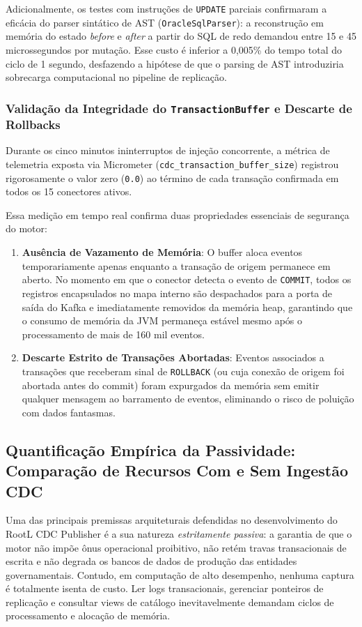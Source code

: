 \documentclass[12pt]{article}
\begin{document}
Adicionalmente, os testes com instruções de \texttt{UPDATE} parciais confirmaram a eficácia do parser sintático de AST (\texttt{OracleSqlParser}): a reconstrução em memória do estado \textit{before} e \textit{after} a partir do SQL de redo demandou entre 15 e 45 microssegundos por mutação. Esse custo é inferior a 0,005\% do tempo total do ciclo de 1 segundo, desfazendo a hipótese de que o parsing de AST introduziria sobrecarga computacional no pipeline de replicação.

\subsubsection{Validação da Integridade do \texttt{TransactionBuffer} e Descarte de Rollbacks}

Durante os cinco minutos ininterruptos de injeção concorrente, a métrica de telemetria exposta via Micrometer (\texttt{cdc\_transaction\_buffer\_size}) registrou rigorosamente o valor zero (\texttt{0.0}) ao término de cada transação confirmada em todos os 15 conectores ativos. 

Essa medição em tempo real confirma duas propriedades essenciais de segurança do motor:
\begin{enumerate}
  \item \textbf{Ausência de Vazamento de Memória}: O buffer aloca eventos temporariamente apenas enquanto a transação de origem permanece em aberto. No momento em que o conector detecta o evento de \texttt{COMMIT}, todos os registros encapsulados no mapa interno são despachados para a porta de saída do Kafka e imediatamente removidos da memória heap, garantindo que o consumo de memória da JVM permaneça estável mesmo após o processamento de mais de 160 mil eventos.
  \item \textbf{Descarte Estrito de Transações Abortadas}: Eventos associados a transações que receberam sinal de \texttt{ROLLBACK} (ou cuja conexão de origem foi abortada antes do commit) foram expurgados da memória sem emitir qualquer mensagem ao barramento de eventos, eliminando o risco de poluição com dados fantasmas.
\end{enumerate}

\subsection{Quantificação Empírica da Passividade: Comparação de Recursos Com e Sem Ingestão CDC}
\label{sec:eval_overhead}

Uma das principais premissas arquiteturais defendidas no desenvolvimento do RootL CDC Publisher é a sua natureza \textit{estritamente passiva}: a garantia de que o motor não impõe ônus operacional proibitivo, não retém travas transacionais de escrita e não degrada os bancos de dados de produção das entidades governamentais. Contudo, em computação de alto desempenho, nenhuma captura é totalmente isenta de custo. Ler logs transacionais, gerenciar ponteiros de replicação e consultar views de catálogo inevitavelmente demandam ciclos de processamento e alocação de memória.
\end{document}
